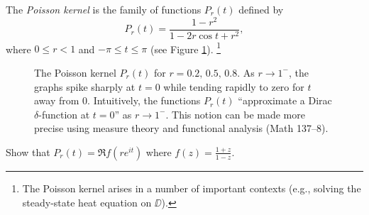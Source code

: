 \documentclass{../math135}
\begin{document}
\begin{exercise}
	The \emph{Poisson kernel} is the family of functions \(P_r(t)\) defined by
	\begin{equation*}
		P_r(t) = \frac{1 - r^2}{1 - 2r \cos t + r^2},
	\end{equation*}
	where \(0 \le r < 1\) and \(-\pi \le t \le \pi\) (see Figure
  \ref{FigurePoisson}).  \footnote{The Poisson kernel arises in a
    number of important contexts (e.g., solving the steady-state heat
    equation on \(\DD\)).}
	  \begin{figure}[h]
	    \begin{center}
	      \caption{\footnotesize The Poisson kernel \(P_r(t)\) for
          \(r = 0.2, \,0.5, \,0.8\).  As \(r\to 1^-\), the graphs
          spike sharply at \(t = 0\) while tending rapidly to zero for
          \(t\) away from \(0\).  Intuitively, the functions
          \(P_r(t)\) ``approximate a Dirac \(\delta\)-function at
          \(t = 0\)'' as \(r \to 1^-\).  This notion can be made more
          precise using measure theory and functional analysis (Math
          137--8).}
	      \label{FigurePoisson}
	    \end{center}
	  \end{figure}

	\begin{problems}
  \item Show that \(P_r(t) = \Re f(re^{it})\) where
    \(f(z) = \frac{1+z}{1-z}\).


\end{problems}
\end{exercise}
\end{document}
